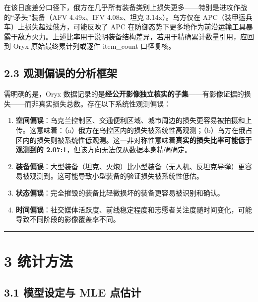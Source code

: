 \documentclass[
  a4paper,
  fontset=none,
]{ctexart}
\begin{document}
在该日度差分口径下，俄方在几乎所有装备类别上损失更多------特别是进攻作战的``矛头''装备（AFV
4.49x、IFV 4.08x、坦克 3.14x）。乌方仅在
APC（装甲运兵车）上损失超过俄方，可能反映了 APC
在防御态势下更多地作为前沿运输工具暴露于敌方火力。上述比率用于说明装备结构差异，若用于精确累计数量引用，应回到
Oryx 原始最终累计列或逐件 item\_count 口径复核。

\hypertarget{ux89c2ux6d4bux504fux8befux7684ux5206ux6790ux6846ux67b6}{%
\subsection{2.3
观测偏误的分析框架}\label{ux89c2ux6d4bux504fux8befux7684ux5206ux6790ux6846ux67b6}}

需明确的是，Oryx
数据记录的是\textbf{经公开影像独立核实的子集}------有影像证据的损失------而非真实损失总数。存在以下系统性观测偏误：

\begin{enumerate}
\def\labelenumi{\arabic{enumi}.}
\item
  \textbf{空间偏误}：乌克兰控制区、交通便利区域、城市周边的损失更容易被拍摄和上传。这意味着：（a）俄方在乌控区内的损失被系统性高观测；（b）乌方在俄占区内的损失则被系统性低观测。这一非对称性意味着\textbf{真实的损失比率可能低于观测到的
  2.07:1}，但该方向无法仅从数据本身精确确定。
\item
  \textbf{装备偏误}：大型装备（坦克、火炮）比小型装备（无人机、反坦克导弹）更容易被观测到。这可能导致小型装备的验证损失被系统性低估。
\item
  \textbf{状态偏误}：完全摧毁的装备比轻微损坏的装备更容易被识别和确认。
\item
  \textbf{时间偏误}：社交媒体活跃度、前线稳定程度和志愿者关注度随时间变化，可能导致不同阶段的影像覆盖率不同。
\end{enumerate}

\begin{center}\rule{0.5\linewidth}{0.5pt}\end{center}

\hypertarget{ux7edfux8ba1ux65b9ux6cd5}{%
\section{3 统计方法}\label{ux7edfux8ba1ux65b9ux6cd5}}

\hypertarget{ux6a21ux578bux8bbeux5b9aux4e0e-mle-ux70b9ux4f30ux8ba1}{%
\subsection{3.1 模型设定与 MLE
点估计}\label{ux6a21ux578bux8bbeux5b9aux4e0e-mle-ux70b9ux4f30ux8ba1}}
\end{document}

